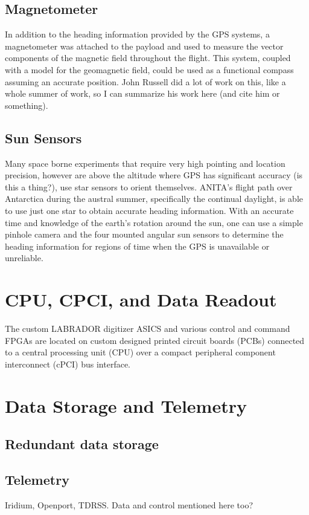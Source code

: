 	\subsection{Magnetometer}
		In addition to the heading information provided by the GPS systems, a magnetometer was attached to the payload and used to measure the vector components of the magnetic field throughout the flight.  This system, coupled with a model for the geomagnetic field, could be used as a functional compass assuming an accurate position.  John Russell did a lot of work on this, like a whole summer of work, so I can summarize his work here (and cite him or something).
	\subsection{Sun Sensors}
		Many space borne experiments that require very high pointing and location precision, however are above the altitude where GPS has significant accuracy (is this a thing?), use star sensors to orient themselves.  ANITA's flight path over Antarctica during the austral summer, specifically the continual daylight, is able to use just one star to obtain accurate heading information.  With an accurate time and knowledge of the earth's rotation around the sun, one can use a simple pinhole camera and the four mounted angular sun sensors to determine the heading information for regions of time when the GPS is unavailable or unreliable.
		
\section{CPU, CPCI, and Data Readout}
	The custom LABRADOR digitizer ASICS and various control and command FPGAs are located on custom designed printed circuit boards (PCBs) connected to a central processing unit (CPU) over a compact peripheral component interconnect (cPCI) bus interface.  
	
\section{Data Storage and Telemetry}
	\subsection{Redundant data storage}
	
	\subsection{Telemetry}
		Iridium, Openport, TDRSS.  Data and control mentioned here too?
		
